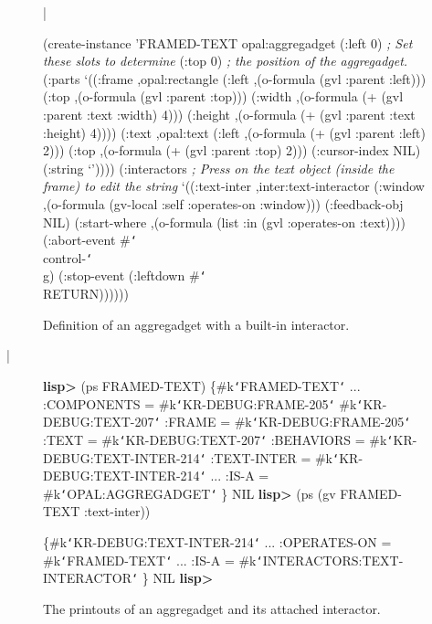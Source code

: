 \begin{figure}
\bar{}
\begin{programexample}
(create-instance 'FRAMED-TEXT opal:aggregadget
   (:left 0)      {\it ; Set these slots to determine}
   (:top 0)       {\it ; the position of the aggregadget.}
   (:parts
    `((:frame ,opal:rectangle
          (:left ,(o-formula (gvl :parent :left)))
          (:top ,(o-formula (gvl :parent :top)))
          (:width ,(o-formula (+ (gvl :parent :text :width) 4)))
          (:height ,(o-formula (+ (gvl :parent :text :height) 4))))
      (:text ,opal:text
          (:left ,(o-formula (+ (gvl :parent :left) 2)))
          (:top ,(o-formula (+ (gvl :parent :top) 2)))
          (:cursor-index NIL)
          (:string `'))))
   (:interactors
     {\it ; Press on the text object (inside the frame) to edit the string}
    `((:text-inter ,inter:text-interactor
	  (:window ,(o-formula (gv-local :self :operates-on :window)))
          (:feedback-obj NIL)
          (:start-where ,(o-formula
                          (list :in (gvl :operates-on :text))))
          (:abort-event \#{\tt\char`\\}control-{\tt\char`\\}g)
          (:stop-event (:leftdown \#{\tt\char`\\}RETURN))))))
\end{programexample}
\caption{Definition of an aggregadget with a built-in interactor.}
\end{figure}

\bar{}

\begin{figure}
\begin{programexample}

{\bf lisp>} (ps FRAMED-TEXT)
\{\#k{\tt\char`\<}FRAMED-TEXT{\tt\char`\>}
  ...
  :COMPONENTS =  \#k{\tt\char`\<}KR-DEBUG:FRAME-205{\tt\char`\>} \#k{\tt\char`\<}KR-DEBUG:TEXT-207{\tt\char`\>}
  :FRAME =  \#k{\tt\char`\<}KR-DEBUG:FRAME-205{\tt\char`\>}
  :TEXT =  \#k{\tt\char`\<}KR-DEBUG:TEXT-207{\tt\char`\>}
  :BEHAVIORS =  \#k{\tt\char`\<}KR-DEBUG:TEXT-INTER-214{\tt\char`\>}
  :TEXT-INTER =  \#k{\tt\char`\<}KR-DEBUG:TEXT-INTER-214{\tt\char`\>}
  ...
  :IS-A =  \#k{\tt\char`\<}OPAL:AGGREGADGET{\tt\char`\>}
\}
NIL
{\bf lisp>} (ps (gv FRAMED-TEXT :text-inter))

\{\#k{\tt\char`\<}KR-DEBUG:TEXT-INTER-214{\tt\char`\>}
  ...
  :OPERATES-ON =  \#k{\tt\char`\<}FRAMED-TEXT{\tt\char`\>}
  ...
  :IS-A =  \#k{\tt\char`\<}INTERACTORS:TEXT-INTERACTOR{\tt\char`\>}
\}
NIL
{\bf lisp>}

\end{programexample}
\caption{The printouts of an aggregadget and its attached interactor.}
\end{figure}


